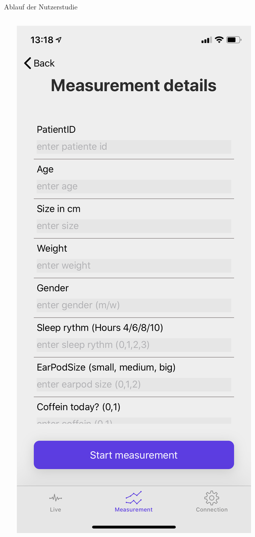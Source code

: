 \documentclass[18pt]{beamer}
\begin{document}
\begin{frame}{Ablauf der Nutzerstudie}
\begin{center}
\begin{columns}[T]
\begin{column}{.33\textwidth}
            \end{column}%
            \hfill%
            \begin{column}{.33\textwidth}
                \centering
                \includegraphics[scale=0.1]{images/app/measurement_details.PNG}

\end{column}
\end{columns}
\end{center}
\end{frame}
\end{document}
